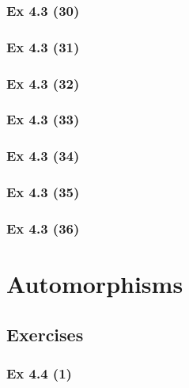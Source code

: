 \subsubsection{Ex 4.3 (30)}\label{sec:Ex_4.3.30}

\newpage		%

\subsubsection{Ex 4.3 (31)}\label{sec:Ex_4.3.31}

\subsubsection{Ex 4.3 (32)}\label{sec:Ex_4.3.32}

\subsubsection{Ex 4.3 (33)}\label{sec:Ex_4.3.33}

\subsubsection{Ex 4.3 (34)}\label{sec:Ex_4.3.34}

\subsubsection{Ex 4.3 (35)}\label{sec:Ex_4.3.35}

\subsubsection{Ex 4.3 (36)}\label{sec:Ex_4.3.36}

\newpage		%

\section{Automorphisms}\label{sec:4.4}	
\subsection*{Exercises}\label{sec:4.4_Exercises}

\subsubsection{Ex 4.4 (1)}\label{sec:Ex_4.4.1}

